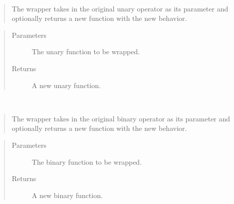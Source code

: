 \documentclass[letterpaper,10pt,english]{sphinxmanual}
\begin{document}
\begin{fulllineitems}
\label{\detokenize{index:Wrappers.unary_operator_wrapper}}~\begin{quote}

\sphinxAtStartPar
The wrapper takes in the original unary operator as its parameter and
optionally returns a new function with the new behavior.
\end{quote}
\begin{quote}\begin{description}
\item[{Parameters}] \leavevmode
\sphinxAtStartPar
{} \textendash{} The unary function to be wrapped.

\item[{Returns}] \leavevmode
\sphinxAtStartPar
A new unary function.

\end{description}\end{quote}

\end{fulllineitems}


\begin{fulllineitems}
\label{\detokenize{index:Wrappers.binary_operator_wrapper}}~\begin{quote}

\sphinxAtStartPar
The wrapper takes in the original binary operator as its parameter and
optionally returns a new function with the new behavior.
\end{quote}
\begin{quote}\begin{description}
\item[{Parameters}] \leavevmode
\sphinxAtStartPar
{} \textendash{} The binary function to be wrapped.

\item[{Returns}] \leavevmode
\sphinxAtStartPar
A new binary function.

\end{description}\end{quote}

\end{fulllineitems}
\end{document}
